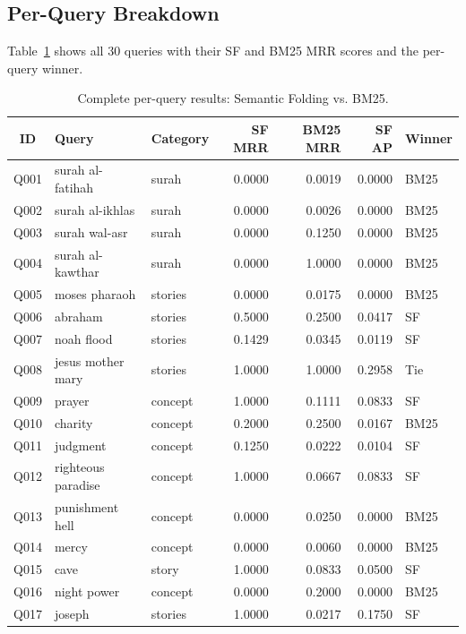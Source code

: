 \documentclass[conference]{IEEEtran}
\begin{document}
\subsection{Per-Query Breakdown}

Table~\ref{tab:perquery} shows all 30 queries with their SF and BM25 MRR
scores and the per-query winner.

\begin{table}[t]
  \centering
  \caption{Complete per-query results: Semantic Folding vs. BM25.}
  \label{tab:perquery}
  \footnotesize
  \begin{tabular}{cllrrrl}
    \toprule
    \textbf{ID} & \textbf{Query} & \textbf{Category} &
    \textbf{\textcolor{sfblue}{SF MRR}} &
    \textbf{BM25 MRR} &
    \textbf{SF AP} &
    \textbf{Winner} \\
    \midrule
    Q001 & surah al-fatihah & surah & 0.0000 & 0.0019 & 0.0000 & BM25 \\
    Q002 & surah al-ikhlas & surah & 0.0000 & 0.0026 & 0.0000 & BM25 \\
    Q003 & surah wal-asr & surah & 0.0000 & 0.1250 & 0.0000 & BM25 \\
    Q004 & surah al-kawthar & surah & 0.0000 & 1.0000 & 0.0000 & BM25 \\
    Q005 & moses pharaoh & stories & 0.0000 & 0.0175 & 0.0000 & BM25 \\
    Q006 & abraham & stories & 0.5000 & 0.2500 & 0.0417 & SF \\
    Q007 & noah flood & stories & 0.1429 & 0.0345 & 0.0119 & SF \\
    Q008 & jesus mother mary & stories & 1.0000 & 1.0000 & 0.2958 & Tie \\
    Q009 & prayer & concept & 1.0000 & 0.1111 & 0.0833 & SF \\
    Q010 & charity & concept & 0.2000 & 0.2500 & 0.0167 & BM25 \\
    Q011 & judgment & concept & 0.1250 & 0.0222 & 0.0104 & SF \\
    Q012 & righteous paradise & concept & 1.0000 & 0.0667 & 0.0833 & SF \\
    Q013 & punishment hell & concept & 0.0000 & 0.0250 & 0.0000 & BM25 \\
    Q014 & mercy & concept & 0.0000 & 0.0060 & 0.0000 & BM25 \\
    Q015 & cave & story & 1.0000 & 0.0833 & 0.0500 & SF \\
    Q016 & night power & concept & 0.0000 & 0.2000 & 0.0000 & BM25 \\
    Q017 & joseph & stories & 1.0000 & 0.0217 & 0.1750 & SF \\

\end{tabular}
\end{table}
\end{document}
